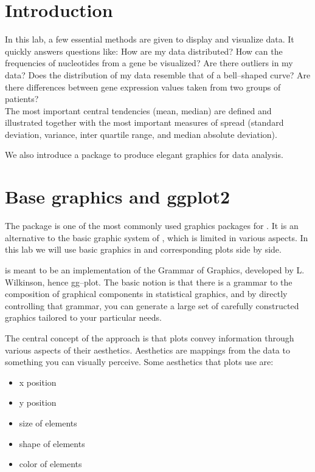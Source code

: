 \documentclass{article}\usepackage[]{graphicx}\usepackage[usenames,dvipsnames]{color}
\begin{document}
\section{Introduction}

In this lab, a few essential methods are given to display and visualize data. 
It quickly answers questions like: How are my data distributed? How can the frequencies 
of nucleotides from a gene be visualized? Are there outliers in my data?
Does the distribution of my data resemble that of a bell--shaped curve? Are
there differences between gene expression values taken from two groups of
patients?\\

The most important central tendencies (mean, median) are defined and
illustrated together with the most important measures of spread (standard
deviation, variance, inter quartile range, and median absolute deviation).

We also introduce  a package to produce elegant graphics
for data analysis.

\section{Base graphics and ggplot2}

The package  is one  of the most commonly used graphics packages for \R.
It is an alternative to the basic graphic system of \R, which is limited in various
aspects. In this lab we will use basic graphics in \R \vspace{2pt} and corresponding
  plots side by side.

 is meant to be an implementation of the Grammar of Graphics, 
developed by L. Wilkinson, hence gg--plot. 
The basic notion is that there is a grammar to the composition of graphical components in 
statistical graphics, and by directly controlling that grammar, you can generate 
a large set of carefully constructed graphics tailored to your particular needs. 


The central concept of the approach is that 
plots convey information through various aspects of their aesthetics.
Aesthetics are mappings from the data to something you can visually perceive.
Some aesthetics that plots use are:

\begin{itemize}
  \item x position
  \item y position
  \item size of elements
  \item shape of elements
  \item color of elements
\end{itemize}
\end{document}
